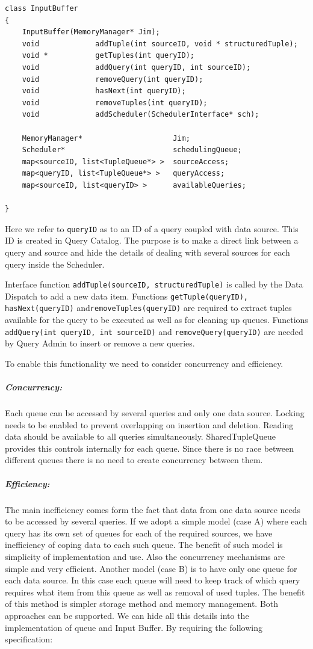 \documentclass[14pt]{article}
\begin{document}
\begin{verbatim}
class InputBuffer
{
	InputBuffer(MemoryManager* Jim);
    void             addTuple(int sourceID, void * structuredTuple);
    void *           getTuples(int queryID);
    void             addQuery(int queryID, int sourceID);
    void             removeQuery(int queryID);
    void             hasNext(int queryID);
    void             removeTuples(int queryID);
    void             addScheduler(SchedulerInterface* sch);

	MemoryManager*                     Jim;
	Scheduler*                         schedulingQueue;
	map<sourceID, list<TupleQueue*> >  sourceAccess;
	map<queryID, list<TupleQueue*> >   queryAccess;
	map<sourceID, list<queryID> >      availableQueries;
	
}
\end{verbatim}

\noindent Here we refer to {\tt queryID} as to an ID of a query coupled with data source. This ID is created in Query Catalog. The purpose is to make a direct link between a query and source and hide the details of dealing with several sources for each query inside the Scheduler.

Interface function {\tt addTuple(sourceID, structuredTuple)} is called by the Data Dispatch to add a new data item. Functions {\tt getTuple(queryID), hasNext(queryID)} and{\tt removeTuples(queryID)} are required to extract tuples available for the query to be executed as well as for cleaning up queues. Functions {\tt addQuery(int queryID, int sourceID)} and {\tt removeQuery(queryID)} are needed by Query Admin to insert or remove a new queries. 

To enable this functionality we need to consider concurrency and efficiency. 

\subparagraph{Concurrency:} Each queue can be accessed by several queries and only one data source. Locking needs to be enabled to prevent overlapping on insertion and deletion. Reading data should be available to all queries simultaneously. SharedTupleQueue provides this controls internally for each queue. Since there is no race between different queues there is no need to create concurrency between them.

\subparagraph{Efficiency:} The main inefficiency comes form the fact that data from one data source needs to be accessed by several queries. If we adopt a simple model (case A) where each query has its own set of queues for each of the required sources, we have inefficiency of coping data to each such queue. The benefit of such model is simplicity of implementation and use. Also the concurrency mechanisms are simple and very efficient. Another model (case B) is to have only one queue for each data source. In this case each queue will need to keep track of which query requires what item from this queue as well as removal of used tuples. The benefit of this method is simpler storage method and memory management. Both approaches can be supported. We can hide all this details into the implementation of queue and Input Buffer. By requiring the following specification:
\end{document}

